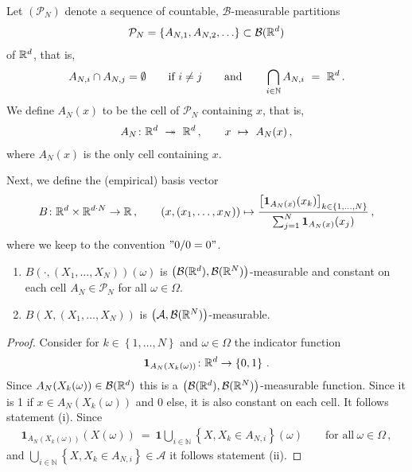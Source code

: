 Let $
\left(
\mathcal{P}_N
\right)
$
denote a sequence of countable, $\mathcal{B}$-measurable partitions 
\begin{align*}
\mathcal{P}_N= \left\{
  A_{N,1},
  A_{N,2},
  \ldots
\right\}
\subset \mathcal{B}(\mathbb{R}^d)
\end{align*}
of $\mathbb{R}^d$, that is, 
\begin{align*}
  A_{N,i}\cap A_{N,j}=\emptyset
  \qquad
  \text{if}\ i\neq j
  \qquad
  \text{and}
  \qquad 
  \bigcap_{i\in\mathbb{N}}A_{N,i}
  \ 
  =
  \ 
  \R^d
  \,.
\end{align*}
We define
$ A_N(x) $ to be the cell of $ \mathcal{P}_N $ containing $x$, that is,
\begin{align*}
  A_N
  \colon
  \R^d 
  \ 
  \twoheadrightarrow 
  \ 
  \R^d  
  \,,\qquad
  x
  \ 
  \mapsto
  \ 
  A_N(x)
  \,,
\end{align*}
where $A_N(x)$ is the only cell containing $x$. 

Next, we define the (empirical) basis vector
\begin{align*}
  B\colon
  \mathbb{R}^d\times \mathbb{R}^{d\cdot N}
  \to
  \mathbb{R}
  \,,
  \qquad
  (x,(x_1,\ldots,x_N))\mapsto
  \frac
  {
    \left[
    \mathbf{1}
    _{
      A_N(x)
    }
    (x_k)
    \right]
    _{k\in \left\{
        1,\ldots,N
    \right\}}
  }
  {
    \sum_{j=1}^N
    \mathbf{1}
    _{
      A_N(x)
    }
    (x_j)
    }
  \,,
\end{align*}
where we keep to the convention $"0/0=0"$.
\begin{lemma}
  \label{lem:basis_meas}
  \quad
  \begin{enumerate}[label=(\roman*)]
\item
  $B(\cdot,(X_1,\ldots,X_N))(\omega)$ is 
  $\left(
    \mathcal{B}(\mathbb{R}^d),\mathcal{B}(\mathbb{R}^N)
  \right)$-measurable
  and
  constant on each cell $A_N\in\mathcal{P}_N$
  for all $\omega\in\Omega$. 
\item
  $B(X,(X_1,\ldots,X_N))$ is $\left(
    \mathcal{A},\mathcal{B}(\mathbb{R}^N)
  \right)$-measurable. 
  \end{enumerate}
\end{lemma}

\begin{proof}
Consider
for $k\in \left\{
  1,\ldots,N
\right\}$
and $\omega\in\Omega$
the indicator function
\begin{align*}
  \mathbf{1}
  _
  {A_N(X_k(\omega))}
  \colon \mathbb{R}^d\to \left\{
    0,1
  \right\}
  \,.
\end{align*}
Since 
$
  {A_N(X_k(\omega))}
  \in\mathcal{B}(\mathbb{R}^d)
$
this is a 
  $\left(
    \mathcal{B}(\mathbb{R}^d),\mathcal{B}(\mathbb{R}^N)
  \right)$-measurable
  function.
  Since it is 1 if $
  x\in
  {A_N(X_k(\omega))}
  $
  and 0 else, it is also constant on each cell. It follows statement (i).
Since
\begin{align*}
  \mathbf{1}
  _
  {A_N(X_k(\omega))}(X(\omega))
  \ 
  =
  \ 
  \mathbf{1}
  \bigcup_{i\in\mathbb{N}}
  \left\{
    X,X_k \in A_{N,i}
  \right\}
  (\omega)
  \qquad
  \text{for all}\ 
  \omega\in\Omega
  \,,
\end{align*}
and
$
  \bigcup_{i\in\mathbb{N}}
  \left\{
    X,X_k \in A_{N,i}
  \right\}
  \in\mathcal{A}
$
it follows statement (ii).
\end{proof}

